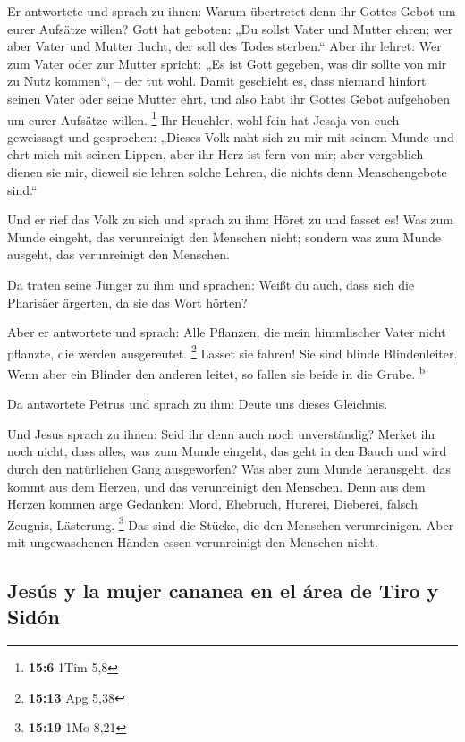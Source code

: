  Er antwortete und sprach zu ihnen: Warum übertretet denn
ihr Gottes Gebot um eurer Aufsätze willen?  Gott hat
geboten: „Du sollst Vater und Mutter ehren; wer aber Vater und Mutter
flucht, der soll des Todes sterben.``  Aber ihr lehret:
Wer zum Vater oder zur Mutter spricht: „Es ist Gott gegeben, was dir
sollte von mir zu Nutz kommen``, -- der tut wohl.  Damit
geschieht es, dass niemand hinfort seinen Vater oder seine Mutter ehrt,
und also habt ihr Gottes Gebot aufgehoben um eurer Aufsätze willen.
\footnote{\textbf{15:6} 1Tim 5,8}  Ihr Heuchler, wohl fein
hat Jesaja von euch geweissagt und gesprochen:  „Dieses
Volk naht sich zu mir mit seinem Munde und ehrt mich mit seinen Lippen,
aber ihr Herz ist fern von mir;  aber vergeblich dienen
sie mir, dieweil sie lehren solche Lehren, die nichts denn
Menschengebote sind.``

 Und er rief das Volk zu sich und sprach zu ihm: Höret zu
und fasset es!  Was zum Munde eingeht, das verunreinigt
den Menschen nicht; sondern was zum Munde ausgeht, das verunreinigt den
Menschen.

 Da traten seine Jünger zu ihm und sprachen: Weißt du
auch, dass sich die Pharisäer ärgerten, da sie das Wort hörten?

 Aber er antwortete und sprach: Alle Pflanzen, die mein
himmlischer Vater nicht pflanzte, die werden ausgereutet. \footnote{\textbf{15:13}
  Apg 5,38}  Lasset sie fahren! Sie sind blinde
Blindenleiter. Wenn aber ein Blinder den anderen leitet, so fallen sie
beide in die Grube. \textsuperscript{b}

 Da antwortete Petrus und sprach zu ihm: Deute uns dieses
Gleichnis.

 Und Jesus sprach zu ihnen: Seid ihr denn auch noch
unverständig?  Merket ihr noch nicht, dass alles, was zum
Munde eingeht, das geht in den Bauch und wird durch den natürlichen Gang
ausgeworfen?  Was aber zum Munde herausgeht, das kommt
aus dem Herzen, und das verunreinigt den Menschen.  Denn
aus dem Herzen kommen arge Gedanken: Mord, Ehebruch, Hurerei, Dieberei,
falsch Zeugnis, Lästerung. \footnote{\textbf{15:19} 1Mo 8,21}
 Das sind die Stücke, die den Menschen verunreinigen.
Aber mit ungewaschenen Händen essen verunreinigt den Menschen nicht.

\hypertarget{jesuxfas-y-la-mujer-cananea-en-el-uxe1rea-de-tiro-y-siduxf3n}{%
\subsection{Jesús y la mujer cananea en el área de Tiro y
Sidón}\label{jesuxfas-y-la-mujer-cananea-en-el-uxe1rea-de-tiro-y-siduxf3n}}

